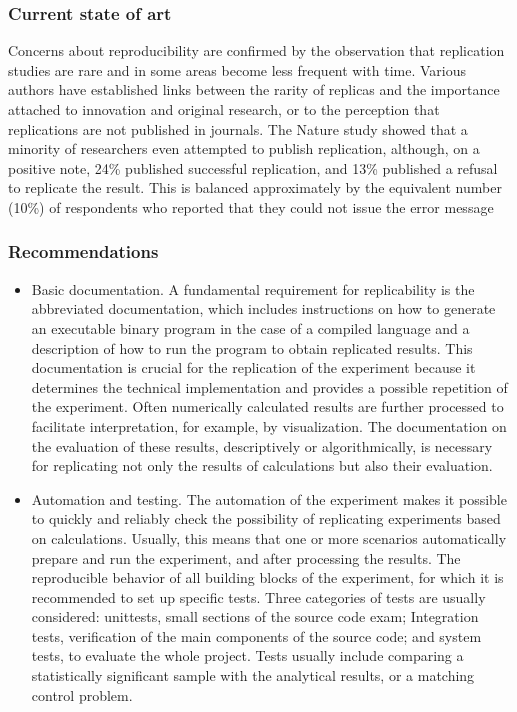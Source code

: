\documentclass{vldb}
\begin{document}
\subsubsection{Current state of art}
Concerns about reproducibility are confirmed by the observation that replication studies are rare and in some areas become less frequent with time. Various authors have established links between the rarity of replicas and the importance attached to innovation and original research, or to the perception that replications are not published in journals. The Nature study showed that a minority of researchers even attempted to publish replication, although, on a positive note, 24\% published successful replication, and 13\% published a refusal to replicate the result. This is balanced approximately by the equivalent number (10\%) of respondents who reported that they could not issue the error message\cite{DBLP:conf/kolicalling/AhadiHIKP16}
\subsubsection{Recommendations}
\begin{itemize}
    \item Basic documentation. A fundamental requirement for replicability is the abbreviated documentation, which includes instructions on how to generate an executable binary program in the case of a compiled language and a description of how to run the program to obtain replicated results. This documentation is crucial for the replication of the experiment because it determines the technical implementation and provides a possible repetition of the experiment. Often numerically calculated results are further processed to facilitate interpretation, for example, by visualization. The documentation on the evaluation of these results, descriptively or algorithmically, is necessary for replicating not only the results of calculations but also their evaluation.
    \item Automation and testing. The automation of the experiment makes it possible to quickly and reliably check the possibility of replicating experiments based on calculations. Usually, this means that one or more scenarios automatically prepare and run the experiment, and after processing the results. The reproducible behavior of all building blocks of the experiment, for which it is recommended to set up specific tests. Three categories of tests are usually considered: unittests, small sections of the source code exam; Integration tests, verification of the main components of the source code; and system tests, to evaluate the whole project. Tests usually include comparing a statistically significant sample with the analytical results, or a matching control problem\cite{DBLP:journals/corr/FehrHHS16}.
\end{itemize}
\end{document}
